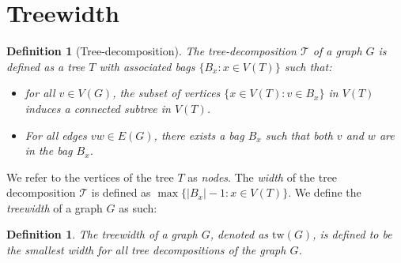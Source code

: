 \documentclass[]{article}
\newcommand{\tree}{\mathcal{T}}
\newcommand{\tw}{\text{tw}}
\newtheorem{definition}[theorem]{Definition}
\theoremstyle{definition}
\numberwithin{theorem}{section}
\numberwithin{equation}{section}
\begin{document}
\section{Treewidth}\label{sec:treewidth}

\begin{definition}[Tree-decomposition]\label{def:tree-decomposition}
	The tree-decomposition $\tree$ of a graph $G$ is defined as a tree $T$ with associated \textit{bags} $\lbrace B_x : x \in V(T) \rbrace$ such that:
	\begin{itemize}
		\item for all $v \in V(G)$, the subset of vertices $\lbrace x \in V(T): v \in B_x \rbrace$ in $V(T)$ induces a connected subtree in $V(T)$.
		\item For all edges $vw \in E(G)$, there exists a bag $B_x$ such that both $v$ and $w$ are in the bag $B_x$.
	\end{itemize}
\end{definition}
We refer to the vertices of the tree $T$ as \textit{nodes}. 
The \textit{width} of the tree decomposition $\tree$ is defined as $\max \lbrace |B_x| - 1 : x \in V(T) \rbrace$. We define the \textit{treewidth} of a graph $G$ as such:


\begin{definition}\label{def:treewidth}
	The treewidth of a graph $G$, denoted as $\tw(G)$, is defined to be the smallest width for all tree decompositions of the graph $G$.
\end{definition}
\end{document}

